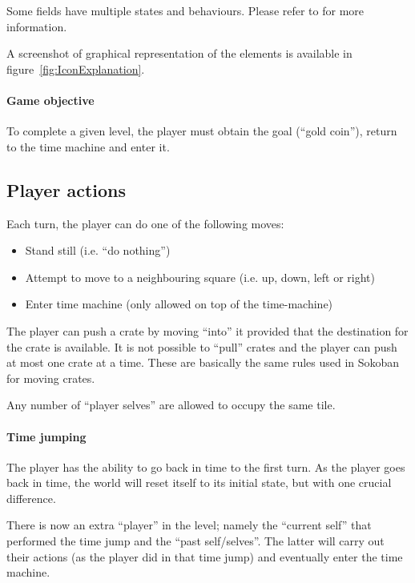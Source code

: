Some fields have multiple states and behaviours.  Please refer to
 for more information.

A screenshot of graphical representation of the elements is available
in figure~\ref{fig:IconExplanation}.


\paragraph{Game objective}
To complete a given level, the player must obtain the goal (``gold coin''),
return to the time machine and enter it.

\subsection{Player actions}
\label{player-actions}
Each turn, the player can do one of the following moves:

\begin{itemize}
\item Stand still (i.e. ``do nothing'')
\item Attempt to move to a neighbouring square (i.e. up, down, left or right)
\item Enter time machine (only allowed on top of the time-machine)
\end{itemize}

The player can push a crate by moving ``into'' it provided that the
destination for the crate is available.  It is not possible to
``pull'' crates and the player can push at most one crate at a time.
These are basically the same rules used in Sokoban for moving crates.

Any number of ``player selves'' are allowed to occupy the same
tile.

\paragraph{Time jumping}
\label{time-jumping}
The player has the ability to go back in time to the first turn.  As
the player goes back in time, the world will reset itself to its
initial state, but with one crucial difference.

There is now an extra ``player'' in the level; namely the ``current
self'' that performed the time jump and the ``past self/selves''.  The
latter will carry out their actions (as the player did in that time
jump) and eventually enter the time machine.

